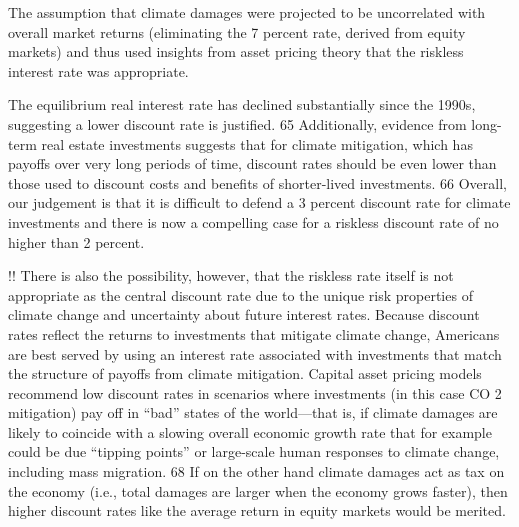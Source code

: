 \documentclass[
]{book}
\begin{document}
The assumption that climate damages were projected to be uncorrelated with overall market
returns (eliminating the 7 percent rate, derived from equity markets) and thus used
insights from asset pricing theory that the riskless interest rate was appropriate.

The equilibrium real interest rate has declined substantially since the 1990s,
suggesting a lower discount rate is justified. 65 Additionally, evidence from long-term real
estate investments suggests that for climate mitigation, which has payoffs over very long
periods of time, discount rates should be even lower than those used to discount costs
and benefits of shorter-lived investments. 66 Overall, our judgement is that it is difficult
to defend a 3 percent discount rate for climate investments and there is now a
compelling case for a riskless discount rate of no higher than 2 percent.

!!
There is also the possibility, however, that the riskless rate itself is not appropriate as
the central discount rate due to the unique risk properties of climate change and
uncertainty about future interest rates. Because discount rates reflect the returns to
investments that mitigate climate change, Americans are best served by using an
interest rate associated with investments that match the structure of payoffs from
climate mitigation. Capital asset pricing models recommend low discount rates in
scenarios where investments (in this case CO 2 mitigation) pay off in ``bad'' states of the
world---that is, if climate damages are likely to coincide with a slowing overall economic
growth rate that for example could be due ``tipping points'' or large-scale human
responses to climate change, including mass migration. 68 If on the other hand climate
damages act as tax on the economy (i.e., total damages are larger when the economy
grows faster), then higher discount rates like the average return in equity markets would
be merited.
\end{document}

